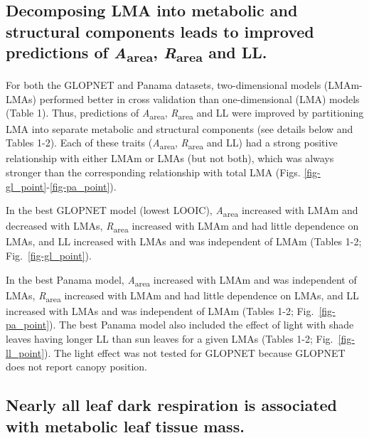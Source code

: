 \documentclass[
  12pt,
  letterpaper,
  DIV=11,
  numbers=noendperiod]{scrartcl}
\begin{document}
\subsection{\texorpdfstring{Decomposing LMA into metabolic and
structural components leads to improved predictions of
\emph{A}\textsubscript{area}, \emph{R}\textsubscript{area} and
LL.}{Decomposing LMA into metabolic and structural components leads to improved predictions of Aarea, Rarea and LL.}}\label{decomposing-lma-into-metabolic-and-structural-components-leads-to-improved-predictions-of-aarea-rarea-and-ll.}

For both the GLOPNET and Panama datasets, two-dimensional models
(LMAm-LMAs) performed better in cross validation than one-dimensional
(LMA) models (Table 1). Thus, predictions of
\emph{A}\textsubscript{area}, \emph{R}\textsubscript{area} and LL were
improved by partitioning LMA into separate metabolic and structural
components (see details below and Tables 1-2). Each of these traits
(\emph{A}\textsubscript{area}, \emph{R}\textsubscript{area} and LL) had
a strong positive relationship with either LMAm or LMAs (but not both),
which was always stronger than the corresponding relationship with total
LMA (Figs. \ref{fig-gl_point}-\ref{fig-pa_point}).

In the best GLOPNET model (lowest LOOIC), \emph{A}\textsubscript{area}
increased with LMAm and decreased with LMAs,
\emph{R}\textsubscript{area} increased with LMAm and had little
dependence on LMAs, and LL increased with LMAs and was independent of
LMAm (Tables 1-2; Fig.~\ref{fig-gl_point}).

In the best Panama model, \emph{A}\textsubscript{area} increased with
LMAm and was independent of LMAs, \emph{R}\textsubscript{area} increased
with LMAm and had little dependence on LMAs, and LL increased with LMAs
and was independent of LMAm (Tables 1-2; Fig.~\ref{fig-pa_point}). The
best Panama model also included the effect of light with shade leaves
having longer LL than sun leaves for a given LMAs (Tables 1-2;
Fig.~\ref{fig-ll_point}). The light effect was not tested for GLOPNET
because GLOPNET does not report canopy position.

\subsection{Nearly all leaf dark respiration is associated with
metabolic leaf tissue
mass.}\label{nearly-all-leaf-dark-respiration-is-associated-with-metabolic-leaf-tissue-mass.}
\end{document}
